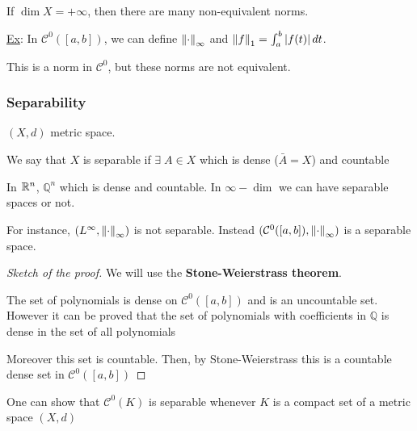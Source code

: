 If \(\dim X = +\infty\), then there are many non-equivalent norms.

\underline{Ex}: In \(\mathcal{C}^0([a,b])\), we can define \(\norm{\cdot}_{\infty}\) and \(\norm{f}_1 = \int_a^b\abs{f(t)} \, dt\).

This is a norm in \(\mathcal{C}^0\), but these norms are not equivalent. 


\subsubsection*{Separability}
\((X, d)\) metric space. 
\begin{definition}
    We say that \(X\) is separable if \(\exists \; A \in X\) which is dense (\(\bar{A} = X\)) and countable 
\end{definition}
In \(\mathbb{R}^n\), \(\mathbb{Q}^n\) which is dense and countable. In \(\infty-\dim\) we can have separable spaces or not. 

For instance, \((L^{\infty}, \norm{\cdot}_{\infty})\) is not separable. Instead \((\mathcal{C}^0([a,b]), \norm{\cdot}_{\infty})\) is a separable space. 

\begin{proof}[Sketch of the proof]
    We will use the \textbf{Stone-Weierstrass theorem}.

    The set of polynomials is dense on \(\mathcal{C}^0([a,b])\) and is an uncountable set. 
    However it can be proved that the set of polynomials with coefficients in \(\mathbb{Q}\) is dense in the set of all polynomials

    Moreover this set is countable. Then, by Stone-Weierstrass this is a countable dense set in \(\mathcal{C}^0([a,b])\)
\end{proof}
\begin{remark}
    One can show that \(\mathcal{C}^0(K)\) is separable whenever \(K\) is a compact set of a metric space \((X,d)\)
\end{remark}

